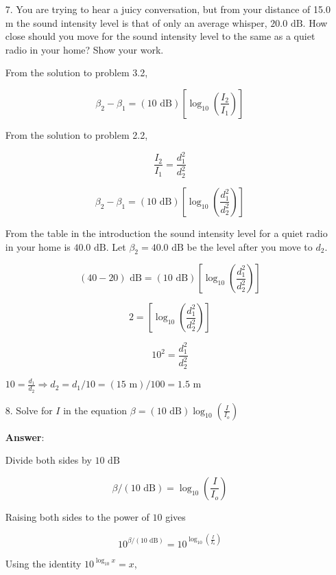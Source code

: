 \documentclass{article}
\newcommand{\ds}[0]{\displaystyle}
\begin{document}
\begin{enumerate}

  \item[7.] You are trying to hear a juicy conversation, but from your distance of 15.0 m the sound intensity level is that of only an average whisper, $20.0 \text{ dB}$. How close should you move for the sound intensity level to the same as a quiet radio in your home? Show your work.

            \ifsolutions
            From the solution to problem 3.2,

            $$\beta_2-\beta_1 = (10 \text{ dB})\left[\log_{10}\left(\frac{I_2}{I_1}\right)\right]$$

            From the solution to problem 2.2,

            $$\frac{I_2}{I_1} = \frac{d_1^2}{d_2^2}$$

            $$\beta_2-\beta_1 = (10 \text{ dB})\left[\log_{10}\left(\frac{d_1^2}{d_2^2}\right)\right]$$

            From the table in the introduction the sound intensity level for a quiet radio in your home is $40.0\text{ dB}$. Let $\beta_2=40.0\text{ dB}$ be the level after you move to $d_2$.

            $$(40-20)\text{ dB} = (10 \text{ dB})\left[\log_{10}\left(\frac{d_1^2}{d_2^2}\right)\right]$$

            $$2 = \left[\log_{10}\left(\frac{d_1^2}{d_2^2}\right)\right]$$

            $$10^2 = \frac{d_1^2}{d_2^2}$$

            $\ds10 = \frac{d_1}{d_2} \Rightarrow d_2 = d_1/10 = (15 \text{ m})/100 = 1.5\text{ m}$
            \else
            \vskip 96pt
            \fi

  \item[8.] Solve for $I$ in the equation $\beta = (10 \text{ dB})\log_{10}\left(\frac{I}{I_o}\right)$

            \ifsolutions
            \textbf{Answer}:

            Divide both sides by ${10 \text{ dB}}$

            $$\beta/(10 \text{ dB})  = \log_{10}\left(\frac{I}{I_o}\right)$$

            Raising both sides to the power of $10$ gives

            $$10^{\beta/(10 \text{ dB})} = 10^{\log_{10}\left(\frac{I}{I_o}\right)}$$

            Using the identity $10^{\log_{10}x} = x$,


\end{enumerate}
\end{document}
